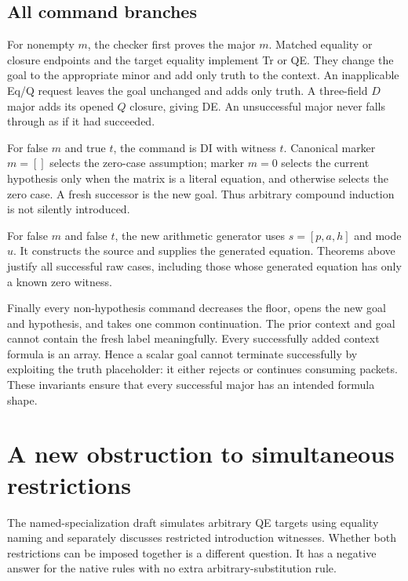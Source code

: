 \documentclass[11pt,letterpaper]{article}
\theoremstyle{definition}\newtheorem{definition}[theorem]{Definition}
\theoremstyle{remark}\newtheorem{remark}[theorem]{Remark}
\begin{document}
\subsection{All command branches}

For nonempty $m$, the checker first proves the major $m$. Matched equality
or closure endpoints and the target equality implement Tr or QE. They
change the goal to the appropriate minor and add only truth to the
context. An inapplicable Eq/Q request leaves the goal unchanged and adds
only truth. A three-field $D$ major adds its opened $Q$ closure, giving
DE. An unsuccessful major never falls through as if it had succeeded.

For false $m$ and true $t$, the command is DI with witness $t$.
Canonical marker $m=[]$ selects the zero-case assumption; marker $m=0$
selects the current hypothesis only when the matrix is a literal
equation, and otherwise selects the zero case. A fresh successor is the
new goal. Thus arbitrary compound induction is not silently introduced.

For false $m$ and false $t$, the new arithmetic generator uses
$s=[p,a,h]$ and mode $u$. It constructs the source and supplies the
generated equation. Theorems above justify all successful raw cases,
including those whose generated equation has only a known zero witness.

Finally every non-hypothesis command decreases the floor, opens the new
goal and hypothesis, and takes one common continuation. The prior context
and goal cannot contain the fresh label meaningfully. Every successfully
added context formula is an array. Hence a scalar goal cannot terminate
successfully by exploiting the truth placeholder: it either rejects or
continues consuming packets. These invariants ensure that every successful
major has an intended formula shape.

\section{A new obstruction to simultaneous restrictions}
\label{sec:obstruction-summary}

The named-specialization draft simulates arbitrary QE targets using
equality naming and separately discusses restricted introduction
witnesses. Whether both restrictions can be imposed together is a
different question\cite{named}. It has a negative answer for the native
rules with no extra arbitrary-substitution rule.
\end{document}
